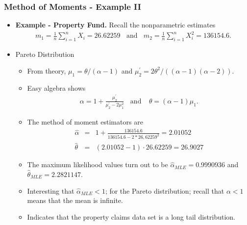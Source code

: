 \documentclass{beamer}
\begin{document}
\begin{frame}%
\frametitle{Method of Moments - Example II}
\begin{itemize}
\item \textbf{Example - Property Fund.} Recall the nonparametric estimates
\begin{eqnarray*}
m_1 = \frac{1}{n} \sum_{i=1}^n X_i = 26.62259 \ \ \ \
\text{and} \ \ \ \
 m_2 = \frac{1}{n} \sum_{i=1}^n X_i^2 = 136154.6 .
\end{eqnarray*}
\item Pareto Distribution
\begin{itemize}
\item From theory, $\mu_1 = \theta/(\alpha -1)$ and $\mu_2^{\prime} = 2\theta^2/((\alpha-1)(\alpha-2) )$.
\item Easy algebra shows
\begin{eqnarray*}
\alpha = 1+ \frac{\mu_2^{\prime}}{\mu_2^{\prime}-2\mu_1^2} \ \ \ \
\text{and} \ \ \ \ \
 \theta = (\alpha-1)\mu_1.
\end{eqnarray*}
\item The method of moment estimators are
\begin{eqnarray*}
\hat{\alpha} &=& 1+ \frac{136154.6}{136154.6-2*26,62259^2} = 2.01052\\
\hat{\theta} &=& (2.01052-1) \cdot 26.62259 = 26.9027
\end{eqnarray*}
\item The maximum likelihood values turn out to be $\hat{\alpha}_{MLE} =  0.9990936$ and $\hat{\theta}_{MLE} = 2.2821147$.
\item Interesting that $\hat{\alpha}_{MLE}<1$; for the Pareto distribution; recall that $\alpha <1$ means that the mean is infinite.
\item Indicates that the property claims data set is a long tail distribution.
\end{itemize}\end{itemize}
\end{frame}
\end{document}
